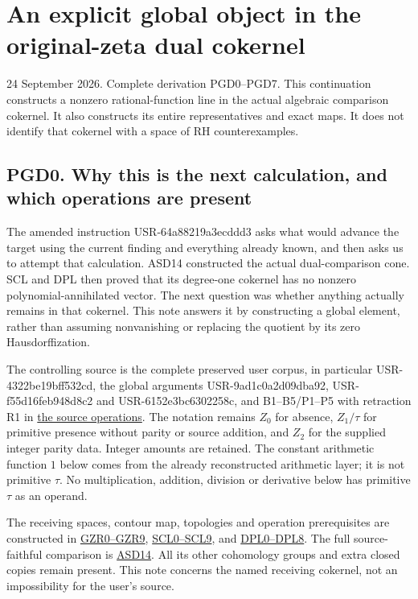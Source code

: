 \section{An explicit global object in the original-zeta dual
cokernel}\label{an-explicit-global-object-in-the-original-zeta-dual-cokernel}

24 September 2026. Complete derivation PGD0--PGD7. This continuation
constructs a nonzero rational-function line in the actual algebraic
comparison cokernel. It also constructs its entire representatives and
exact maps. It does not identify that cokernel with a space of RH
counterexamples.

\subsection{PGD0. Why this is the next calculation, and which operations
are
present}\label{pgd0.-why-this-is-the-next-calculation-and-which-operations-are-present}

The amended instruction USR-64a88219a3ecddd3 asks what would advance the
target using the current finding and everything already known, and then
asks us to attempt that calculation. ASD14 constructed the actual
dual-comparison cone. SCL and DPL then proved that its degree-one
cokernel has no nonzero polynomial-annihilated vector. The next question
was whether anything actually remains in that cokernel. This note
answers it by constructing a global element, rather than assuming
nonvanishing or replacing the quotient by its zero Hausdorffization.

The controlling source is the complete preserved user corpus, in
particular USR-4322be19bff532cd, the global arguments
USR-9ad1c0a2d09dba92, USR-f55d16feb948d8c2 and USR-6152e3bc6302258c, and
B1--B5/P1--P5 with retraction R1 in
\href{../foundations/user_definitions_20260924/SOURCE_OPERATIONS_AND_PROOFS.md}{the
source operations}. The notation remains \(Z_0\) for absence,
\(Z_1/\tau\) for primitive presence without parity or source addition,
and \(Z_2\) for the supplied integer parity data. Integer amounts are
retained. The constant arithmetic function \(1\) below comes from the
already reconstructed arithmetic layer; it is not primitive \(\tau\). No
multiplication, addition, division or derivative below has primitive
\(\tau\) as an operand.

The receiving spaces, contour map, topologies and operation
prerequisites are constructed in
\href{GLOBAL_ORIGINAL_ZETA_RESIDUE_DUALITY_INDEPENDENT.md}{GZR0--GZR9},
\href{SPECTRAL_COKERNEL_DIVISIBILITY_AND_FINITE_LIFTING.md}{SCL0--SCL9},
and
\href{DUALITY_COKERNEL_POLYNOMIAL_LIFTING_INDEPENDENT.md}{DPL0--DPL8}.
The full source-faithful comparison is
\href{ACTUAL_SUPPORTED_DUALITY_INDEPENDENT.md}{ASD14}. All its other
cohomology groups and extra closed copies remain present. This note
concerns the named receiving cokernel, not an impossibility for the
user's source.

